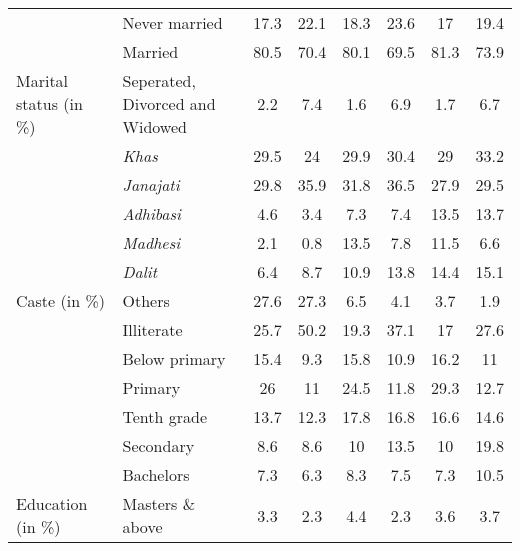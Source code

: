 \begin{table}[tb]
{\begin{tabular}{llcccccc}
 & Never married & 17.3 & 22.1 & 18.3 & 23.6 & 17 & 19.4\\

 & Married & 80.5 & 70.4 & 80.1 & 69.5 & 81.3 & 73.9\\

\multirow[t]{-3}{10em}{Marital status (in \%)} & Seperated, Divorced and Widowed & 2.2 & 7.4 & 1.6 & 6.9 & 1.7 & 6.7\\

 & \textit{Khas} & 29.5 & 24 & 29.9 & 30.4 & 29 & 33.2\\

 & \textit{Janajati} & 29.8 & 35.9 & 31.8 & 36.5 & 27.9 & 29.5\\

 & \textit{Adhibasi} & 4.6 & 3.4 & 7.3 & 7.4 & 13.5 & 13.7\\

 & \textit{Madhesi} & 2.1 & 0.8 & 13.5 & 7.8 & 11.5 & 6.6\\

 & \textit{Dalit} & 6.4 & 8.7 & 10.9 & 13.8 & 14.4 & 15.1\\

\multirow[t]{-6}{10em}{Caste (in \%)} & Others & 27.6 & 27.3 & 6.5 & 4.1 & 3.7 & 1.9\\

 & Illiterate & 25.7 & 50.2 & 19.3 & 37.1 & 17 & 27.6\\

 & Below primary & 15.4 & 9.3 & 15.8 & 10.9 & 16.2 & 11\\

 & Primary & 26 & 11 & 24.5 & 11.8 & 29.3 & 12.7\\

 & Tenth grade & 13.7 & 12.3 & 17.8 & 16.8 & 16.6 & 14.6\\

 & Secondary & 8.6 & 8.6 & 10 & 13.5 & 10 & 19.8\\

 & Bachelors & 7.3 & 6.3 & 8.3 & 7.5 & 7.3 & 10.5\\

\multirow[t]{-7}{10em}{Education (in \%)} & Masters \& above & 3.3 & 2.3 & 4.4 & 2.3 & 3.6 & 3.7\\
\midrule
\bottomrule
\end{tabular}}
\label{tab:SummarySSVE}
\end{table}
